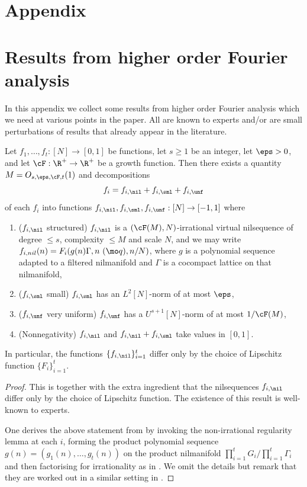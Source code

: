 \appendix %
\section*{Appendix}\section{Results from higher order Fourier analysis}
In this appendix we collect some results from higher order Fourier analysis which we need at various points in the paper. All are known to experts and/or are small perturbations of results that already appear in the literature.

\begin{thm}\label{t:arl}
Let $f_1, \ldots, f_t: [N] \to [0,1]$ be functions, let $s \geq 1$ be an integer, let $\eps > 0$, and let $\cF: \R^+ \to \R^+$ be a growth function. Then there exists a quantity $M=O_{s,\eps,\cF,t}(1)$ and  decompositions 
\[f_i = f_{i,\nil} + f_{i,\sml} + f_{i,\unf} \]
of each $f_i$ into functions $f_{i, \nil}, f_{i, \sml}, f_{i,\unf}: [N] \to [-1,1]$ where 
\begin{enumerate}
\item($f_{i,\nil}$ structured) $f_{i,\nil}$ is a $(\cF(M), N)$-irrational virtual nilsequence of degree $\leq s$, complexity $\leq M$ and scale $N$, and we may write $f_{i,nil}(n) = F_i(g(n) \Gamma, n \ (\mo q), n/N)$, where $g$ is a polynomial sequence adapted to a filtered nilmanifold and $\Gamma$ is a cocompact lattice on that nilmanifold,
\item($f_{i,\sml}$ small) $f_{i,\sml}$ has an $L^2[N]$-norm of at most $\eps$,
\item($f_{i,\unf}$ very uniform) $f_{i,\unf}$ has a $U^{s+1}[N]$-norm of at most $1/\cF(M)$,
\item(Nonnegativity) $f_{i,\nil}$ and $f_{i,\nil} + f_{i,\sml}$ take values in $[0,1]$.
\end{enumerate}
In particular, the  functions $\{f_{i,\nil}\}_{i=1}^t$ differ only by the choice of Lipschitz function $\{F_i\}_{i=1}^t$. 
\end{thm}
\begin{proof}
This is \cite[Theorem 1.2]{GT10} together with the extra ingredient that the nilsequences $f_{i,\nil}$ differ only by the choice of Lipschitz function. The existence of  this result is well-known to experts. 

One derives the above statement from \cite{GT10} by invoking the non-irrational regularity lemma \cite[Proposition 2.7]{GT10} at each $i$, forming the product polynomial sequence $g(n) = (g_1(n), \ldots, g_t(n))$ on the product nilmanifold $\prod_{i=1}^t G_i/\prod_{i=1}^t \Gamma_i$ and then factorising for irrationality as in \cite[Chapter 2]{GT10}. We omit the details but remark that they are worked out in a similar setting in \cite[Appendix A]{K20}.
\end{proof}


